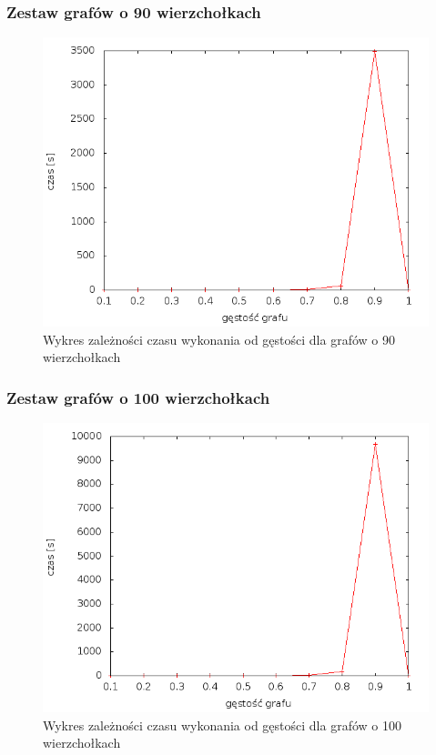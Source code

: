 \documentclass[12pt, a4paper]{article}
\begin{document}
\subsubsection*{Zestaw grafów o 90 wierzchołkach}
\begin{figure}[!h]
    \begin{center}
	\includegraphics[scale=0.5]{../experiment_1/img/dim/dim_90.png}
	\caption{Wykres zależności czasu wykonania od gęstości dla grafów o 90 wierzchołkach}
    \end{center}
\end{figure}
\FloatBarrier
\subsubsection*{Zestaw grafów o 100 wierzchołkach}
\begin{figure}[!h]
    \begin{center}
	\includegraphics[scale=0.5]{../experiment_1/img/dim/dim_100.png}
	\caption{Wykres zależności czasu wykonania od gęstości dla grafów o 100 wierzchołkach}
    \end{center}
\end{figure}
\FloatBarrier
\end{document}
